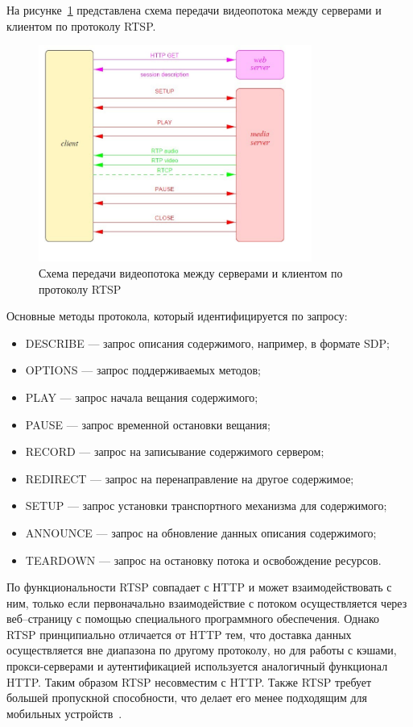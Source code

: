 На рисунке~\ref{pr:rtsp} представлена схема передачи видеопотока между серверами и клиентом по протоколу RTSP.

\begin{figure}[h]
	\centering
	\includegraphics[width=0.8\textwidth]{img/rtsp.jpeg}
	\caption{Схема передачи видеопотока между серверами и клиентом по протоколу RTSP}
	\label{pr:rtsp}
\end{figure}

\clearpage

Основные методы протокола, который идентифицируется по запросу:
\begin{itemize}
	\item DESCRIBE --- запрос описания содержимого, например, в формате SDP;
	\item OPTIONS --- запрос поддерживаемых методов;
	\item PLAY --- запрос начала вещания содержимого;
	\item PAUSE --- запрос временной остановки вещания;
	\item RECORD --- запрос на записывание содержимого сервером;
	\item REDIRECT --- запрос на перенаправление на другое содержимое;
	\item SETUP --- запрос установки транспортного механизма для содержимого;
	\item ANNOUNCE --- запрос на обновление данных описания содержимого;
	\item TEARDOWN --- запрос на остановку потока и освобождение ресурсов.
\end{itemize}

По функциональности RTSP совпадает с НTTP и может взаимодействовать с ним, только если первоначально взаимодействие с потоком осуществляется через веб--страницу с помощью специального программного обеспечения.
Однако RTSP принципиально отличается от HTTP тем, что доставка данных осуществляется вне диапазона по другому протоколу, но для работы с кэшами, прокси-серверами и аутентификацией используется аналогичный  функционал HTTP. Таким образом RTSP несовместим с HTTP. Также RTSP  требует большей пропускной способности, что делает его менее подходящим для мобильных устройств~\cite{rfc_rtsp, rfc_http_auth}.

